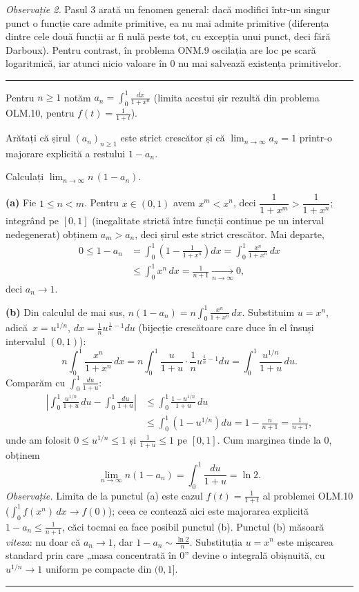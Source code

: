 \emph{Observație 2.} Pasul 3 arată un fenomen general: dacă modifici într-un singur
punct o funcție care admite primitive, ea nu mai admite primitive (diferența dintre
cele două funcții ar fi nulă peste tot, cu excepția unui punct, deci fără Darboux).
Pentru contrast, în problema ONM.9 oscilația are loc pe scară logaritmică, iar
atunci nicio valoare în $0$ nu mai salvează existența primitivelor.
\vspace{1mm}\hrule

Pentru $n\ge 1$ notăm $\displaystyle a_n = \int_0^1 \frac{dx}{1+x^n}$ (limita acestui șir rezultă din problema OLM.10, pentru $f(t)=\frac{1}{1+t}$).
\begin{parti}
  \item Arătați că șirul $(a_n)_{n\ge1}$ este strict crescător și că
        $\lim_{n\to\infty}a_n = 1$ printr-o majorare explicită a restului
        $1-a_n$.
  \item Calculați $\displaystyle\lim_{n\to\infty} n\,(1-a_n)$.
\end{parti}
\sol\noindent\textbf{(a)} Fie $1\le n<m$. Pentru $x\in(0,1)$ avem $x^m < x^n$, deci
$\dfrac{1}{1+x^m} > \dfrac{1}{1+x^n}$; integrând pe $[0,1]$ (inegalitate strictă
între funcții continue pe un interval nedegenerat) obținem $a_m > a_n$, deci șirul
este strict crescător. Mai departe,
\[ \begin{aligned} 0 \le 1-a_n &= \int_0^1\left(1-\frac{1}{1+x^n}\right)dx
= \int_0^1\frac{x^n}{1+x^n}\,dx\\
&\le \int_0^1 x^n\,dx = \frac{1}{n+1}
\xrightarrow[n\to\infty]{}0, \end{aligned} \]
deci $a_n\to 1$.

\noindent\textbf{(b)} Din calculul de mai sus,
$n(1-a_n) = n\int_0^1\frac{x^n}{1+x^n}\,dx$. Substituim $u=x^n$, adică\
$x=u^{1/n}$, $dx = \frac1n u^{\frac1n-1}du$ (bijecție crescătoare care duce în el însuși intervalul $(0,1)$):
\[ n\int_0^1\frac{x^n}{1+x^n}\,dx
= n\int_0^1 \frac{u}{1+u}\cdot\frac1n u^{\frac1n-1}du
= \int_0^1 \frac{u^{1/n}}{1+u}\,du . \]
Comparăm cu $\int_0^1\frac{du}{1+u}$:
\[ \begin{aligned} \left|\int_0^1\frac{u^{1/n}}{1+u}\,du - \int_0^1\frac{du}{1+u}\right|
&\le \int_0^1 \frac{1-u^{1/n}}{1+u}\,du\\
&\le \int_0^1\left(1-u^{1/n}\right)du = 1 - \frac{n}{n+1} = \frac{1}{n+1}, \end{aligned} \]
unde am folosit $0\le u^{1/n}\le 1$ și $\frac{1}{1+u}\le 1$ pe $[0,1]$. Cum
marginea tinde la $0$, obținem
\[ \lim_{n\to\infty} n(1-a_n) = \int_0^1\frac{du}{1+u} = \ln 2 . \]
\emph{Observație.} Limita de la punctul (a) este cazul $f(t)=\frac{1}{1+t}$ al problemei
OLM.10 ($\int_0^1 f(x^n)\,dx\to f(0)$); ceea ce contează aici este
majorarea explicită $1-a_n\le\frac{1}{n+1}$, căci tocmai ea face posibil punctul (b).
Punctul (b) măsoară \emph{viteza}: nu doar
că $a_n\to1$, dar $1-a_n\sim\frac{\ln 2}{n}$. Substituția $u=x^n$ este mișcarea
standard prin care „masa concentrată în $0$'' devine o integrală obișnuită, cu
$u^{1/n}\to1$ uniform pe compacte din $(0,1]$.
\vspace{1mm}\hrule

